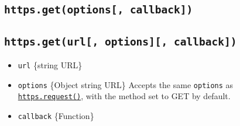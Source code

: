 \begin{Shaded}
\begin{Highlighting}[]
\OperatorTok{=} \NormalTok{(}\NormalTok{)}\OperatorTok{;}
\OperatorTok{=} \NormalTok{(}\NormalTok{)}\OperatorTok{;}

\OperatorTok{=}\NormalTok{ \{}
  \OperatorTok{:}\NormalTok{(}\NormalTok{)}\OperatorTok{,}
  \OperatorTok{:} \OperatorTok{,}
\NormalTok{\}}\OperatorTok{;}

\OperatorTok{,}\OperatorTok{,}\KeywordTok{=\textgreater{}}\NormalTok{ \{}
\NormalTok{(}\NormalTok{)}\OperatorTok{;}
\NormalTok{(}\StringTok{\textquotesingle{}}\NormalTok{)}\OperatorTok{;}
\NormalTok{\})}\NormalTok{(}\NormalTok{)}\OperatorTok{;}
\end{Highlighting}
\end{Shaded}

\subsection{\texorpdfstring{\texttt{https.get(options{[},\ callback{]})}}{https.get(options{[}, callback{]})}}\label{https.getoptions-callback}

\subsection{\texorpdfstring{\texttt{https.get(url{[},\ options{]}{[},\ callback{]})}}{https.get(url{[}, options{]}{[}, callback{]})}}\label{https.geturl-options-callback}

\begin{itemize}
\tightlist
\item
  \texttt{url} \{string \textbar{} URL\}
\item
  \texttt{options} \{Object \textbar{} string \textbar{} URL\} Accepts
  the same \texttt{options} as
  \hyperref[httpsrequestoptions-callback]{\texttt{https.request()}},
  with the method set to GET by default.
\item
  \texttt{callback} \{Function\}
\end{itemize}

